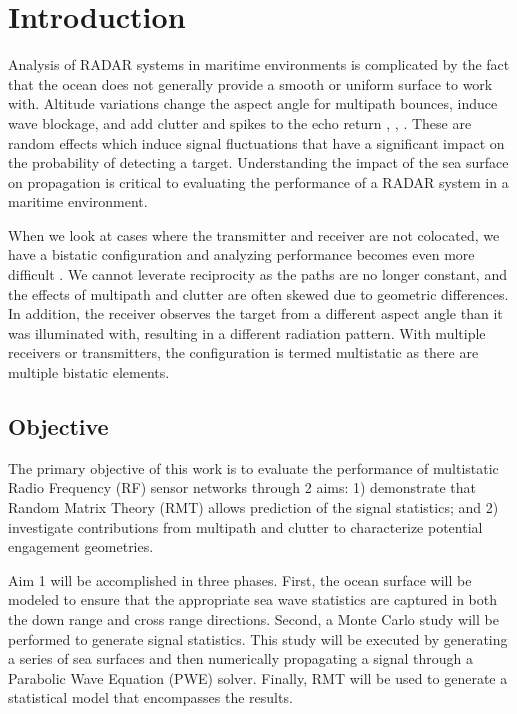 \section{Introduction}
Analysis of RADAR systems in maritime environments is complicated by the fact that the ocean does not generally provide a smooth or uniform surface to work with. Altitude variations change the aspect angle for multipath bounces, induce wave blockage, and add clutter and spikes to the echo return \cite{skolnik_handbook}, \cite{blake_radar}, \cite{nathanson_radar}. These are random effects which induce signal fluctuations that have a significant impact on the probability of detecting a target. Understanding the impact of the sea surface on propagation is critical to evaluating the performance of a RADAR system in a maritime environment.

When we look at cases where the transmitter and receiver are not colocated, we have a bistatic configuration and analyzing performance becomes even more difficult \cite{willis_bistatic}. We cannot leverate reciprocity as the paths are no longer constant, and the effects of multipath and clutter are often skewed due to geometric differences.  In addition, the receiver observes the target from a different aspect angle than it was illuminated with, resulting in a different radiation pattern. With multiple receivers or transmitters, the configuration is termed multistatic as there are multiple bistatic elements.

\subsection{Objective}
The primary objective of this work is to evaluate the performance of multistatic Radio Frequency (RF) sensor networks through 2 aims: 1) demonstrate that Random Matrix Theory (RMT) allows prediction of the signal statistics; and 2) investigate contributions from multipath and clutter to characterize potential engagement geometries. 

Aim 1 will be accomplished in three phases. First, the ocean surface will be modeled to ensure that the appropriate sea wave statistics are captured in both the down range and cross range directions. Second, a Monte Carlo study will be performed to generate signal statistics. This study will be executed by generating a series of sea surfaces and then numerically propagating a signal through a Parabolic Wave Equation (PWE) solver. Finally, RMT will be used to generate a statistical model that encompasses the results.

